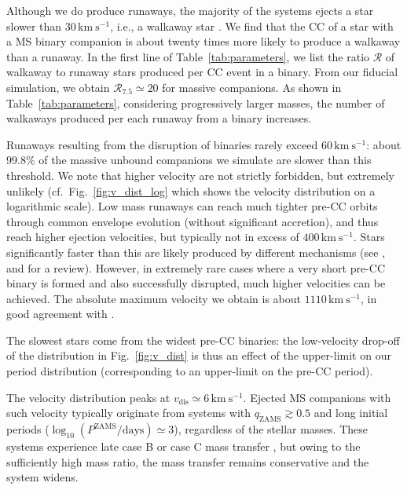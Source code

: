 \documentclass{aa}
\DeclareRobustCommand{\Figref}[1]{Fig.~\ref{#1}}
\DeclareRobustCommand{\Tabref}[1]{Table~\ref{#1}}
\begin{document}
Although we do produce runaways, the majority of the systems ejects a star slower than $30\,\mathrm{km \
  s^{-1}}$, i.e., a walkaway star \citep[][]{de-Mink+2012,lennon:16}. We find that the CC of a star
with a MS binary companion is about twenty times more likely to produce a
walkaway than a runaway. In the first line of \Tabref{tab:parameters},
we list the ratio $\mathcal{R}$ of walkaway to runaway stars produced per CC event in a binary. From our
fiducial simulation, we obtain $\mathcal{R}_\mathrm{7.5}\simeq20$ for
massive companions.
As shown in
\Tabref{tab:parameters}, considering progressively larger masses, the number of walkaways
produced per each runaway from a binary increases.

Runaways resulting from the disruption of binaries rarely exceed $60\,\mathrm{km \
  s^{-1}}$: about 99.8\% of the massive unbound companions we simulate are slower than
this threshold. We note that higher velocity are not strictly
forbidden, but extremely unlikely (cf.~\Figref{fig:v_dist_log} which
shows the velocity distribution on a logarithmic scale).
Low mass runaways can reach much
tighter pre-CC orbits through common envelope evolution (without
significant accretion), and thus reach higher ejection velocities, but typically
not in excess of $400\,\mathrm{km\ s^{-1}}$. Stars significantly
faster than this are likely produced by different mechanisms
(see \citealt{boubert:17b}, and \citealt{brown:15} for a review). However, in extremely rare cases
where a very short pre-CC binary is formed and also successfully disrupted,
much higher velocities can be achieved.  The
absolute maximum velocity we obtain is about $1110\,\mathrm{km\
  s^{-1}}$, in good agreement with \cite{tauris:15}.

The slowest stars come from the widest pre-CC binaries:
the low-velocity drop-off of the distribution in \Figref{fig:v_dist}
is thus
an effect of the upper-limit on our period distribution (corresponding
to an upper-limit on the pre-CC period).

The velocity distribution peaks at $v_\mathrm{dis}\simeq6\,\mathrm{km\
  s^{-1}}$. Ejected MS companions with such velocity typically
originate from systems with $q_\mathrm{ZAMS}\gtrsim0.5$ and long initial
periods ($\log_{10}(P^\mathrm{ZAMS}/\mathrm{days})\simeq3$),
regardless of the stellar masses. These systems experience late case B
or case C mass transfer \citep[][]{lauterborn:70}, but owing to the
sufficiently high mass ratio, the mass transfer remains conservative
and the system widens.
\end{document}
